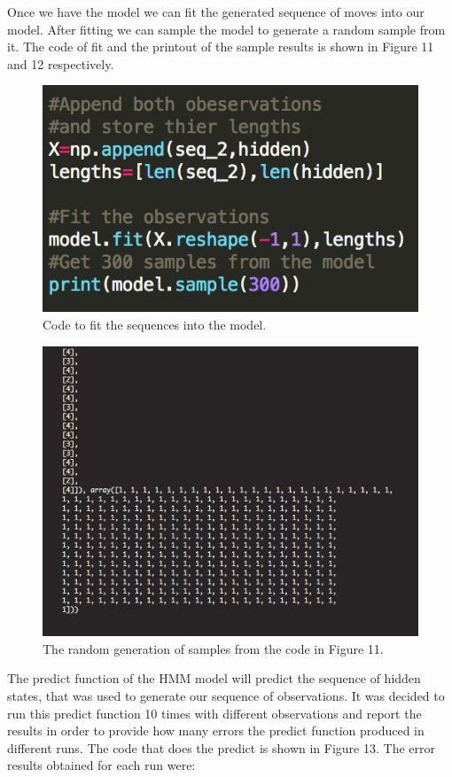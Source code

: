 \documentclass[12pt, letter]{article}
\begin{document}
Once we have the model we can fit the generated sequence of moves into our model. After fitting we can sample the model to generate a random sample from it. The code of fit and the printout of the sample results is shown in Figure 11 and 12 respectively.

 \begin{figure}[htb]
  \centering
  \includegraphics[width=0.50 \textwidth]{./figures/fit.png}
  \caption{Code to fit the sequences into the model.}
\end{figure}

 \begin{figure}[htb]
  \centering
  \includegraphics[width=0.80 \textwidth]{./figures/samples.png}
  \caption{The random generation of samples from the code in Figure 11.}
\end{figure}

\FloatBarrier

The predict function of the HMM model will predict the sequence of hidden states, that was used to generate our sequence of observations. It was decided to run this predict function 10 times with different observations and report the results in order to provide how many errors the predict function produced in different runs. The code that does the predict is shown in Figure 13. The error results obtained for each run were:
\end{document}
